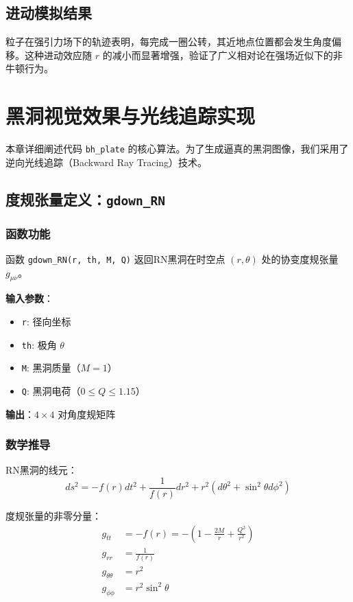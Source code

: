 \documentclass[a4paper,12pt]{article}
\begin{document}
\subsection{进动模拟结果}

粒子在强引力场下的轨迹表明，每完成一圈公转，其近地点位置都会发生角度偏移。这种进动效应随 $r$ 的减小而显著增强，验证了广义相对论在强场近似下的非牛顿行为。

\section{黑洞视觉效果与光线追踪实现}

本章详细阐述代码 \texttt{bh\_plate} 的核心算法。为了生成逼真的黑洞图像，我们采用了逆向光线追踪（Backward Ray Tracing）技术。

\subsection{度规张量定义：\texttt{gdown\_RN}}

\subsubsection{函数功能}

函数 \texttt{gdown\_RN(r, th, M, Q)} 返回RN黑洞在时空点 $(r, \theta)$ 处的协变度规张量 $g_{\mu\nu}$。

\textbf{输入参数}：
\begin{itemize}
    \item \texttt{r}: 径向坐标
    \item \texttt{th}: 极角 $\theta$
    \item \texttt{M}: 黑洞质量（$M=1$）
    \item \texttt{Q}: 黑洞电荷（$0 \leq Q \leq 1.15$）
\end{itemize}

\textbf{输出}：$4 \times 4$ 对角度规矩阵

\subsubsection{数学推导}

RN黑洞的线元：
\begin{equation}
    ds^2 = -f(r)dt^2 + \frac{1}{f(r)}dr^2 + r^2(d\theta^2 + \sin^2\theta d\phi^2)
\end{equation}

度规张量的非零分量：
\begin{align}
    g_{tt} &= -f(r) = -\left(1 - \frac{2M}{r} + \frac{Q^2}{r^2}\right) \\
    g_{rr} &= \frac{1}{f(r)} \\
    g_{\theta\theta} &= r^2 \\
    g_{\phi\phi} &= r^2\sin^2\theta
\end{align}
\end{document}
